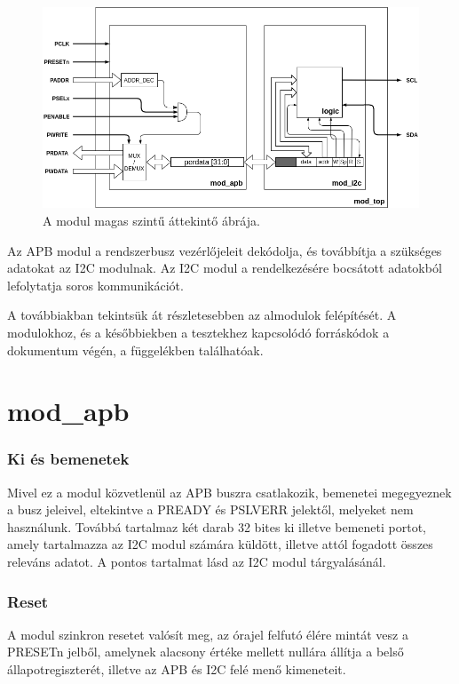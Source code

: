 \begin{figure}[ht!]
    \includegraphics[width=\textwidth]{figures/overview}
    \caption{A modul magas szintű áttekintő ábrája.}
    \label{fig:modtop}
\end{figure}

Az APB modul a rendszerbusz vezérlőjeleit dekódolja, és továbbítja a szükséges adatokat az I2C modulnak.
Az I2C modul a rendelkezésére bocsátott adatokból lefolytatja soros kommunikációt.

A továbbiakban tekintsük át részletesebben az almodulok felépítését. A modulokhoz, és a későbbiekben a tesztekhez kapcsolódó forráskódok a dokumentum végén, a függelékben találhatóak.

\section{mod\_apb}
\subsubsection{Ki és bemenetek}
Mivel ez a modul közvetlenül az APB buszra csatlakozik, bemenetei megegyeznek a busz jeleivel, eltekintve a PREADY és PSLVERR jelektől, melyeket nem használunk. Továbbá tartalmaz két darab 32 bites ki illetve bemeneti portot, amely tartalmazza az I2C modul számára küldött, illetve attól fogadott összes releváns adatot. A pontos tartalmat lásd az I2C modul tárgyalásánál.

\subsubsection{Reset}
    A modul szinkron resetet valósít meg, az órajel felfutó élére mintát vesz a PRESETn jelből, amelynek alacsony értéke mellett nullára állítja a belső állapotregiszterét, illetve az APB és I2C felé menő kimeneteit.

